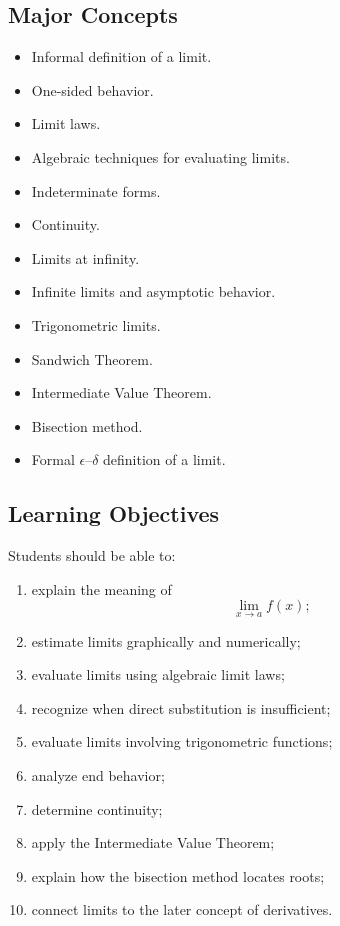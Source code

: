 \documentclass[11pt]{article}
\begin{document}
\subsection{Major Concepts}

\begin{itemize}
    \item Informal definition of a limit.
    \item One-sided behavior.
    \item Limit laws.
    \item Algebraic techniques for evaluating limits.
    \item Indeterminate forms.
    \item Continuity.
    \item Limits at infinity.
    \item Infinite limits and asymptotic behavior.
    \item Trigonometric limits.
    \item Sandwich Theorem.
    \item Intermediate Value Theorem.
    \item Bisection method.
    \item Formal $\epsilon$--$\delta$ definition of a limit.
\end{itemize}

\subsection{Learning Objectives}

Students should be able to:

\begin{enumerate}
    \item explain the meaning of
          \[
          \lim_{x\to a}f(x);
          \]
    \item estimate limits graphically and numerically;
    \item evaluate limits using algebraic limit laws;
    \item recognize when direct substitution is insufficient;
    \item evaluate limits involving trigonometric functions;
    \item analyze end behavior;
    \item determine continuity;
    \item apply the Intermediate Value Theorem;
    \item explain how the bisection method locates roots;
    \item connect limits to the later concept of derivatives.
\end{enumerate}
\end{document}
